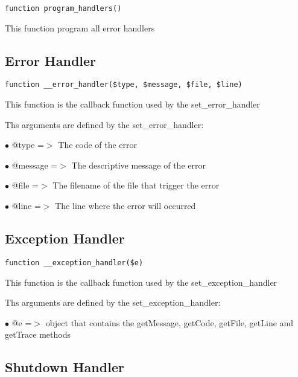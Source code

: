 \documentclass[a4paper]{book}
\begin{document}
\begin{lstlisting}
function program_handlers()
\end{lstlisting}

This function program all error handlers

\hypertarget{toc107}{}
\subsection{Error Handler}

\begin{lstlisting}
function __error_handler($type, $message, $file, $line)
\end{lstlisting}

This function is the callback function used by the set\_error\_handler

Ths arguments are defined by the set\_error\_handler:

\begin{compactitem}
\item[\color{myblue}$\bullet$] @type    =$>$ The code of the error
\item[\color{myblue}$\bullet$] @message =$>$ The descriptive message of the error
\item[\color{myblue}$\bullet$] @file    =$>$ The filename of the file that trigger the error
\item[\color{myblue}$\bullet$] @line    =$>$ The line where the error will occurred
\end{compactitem}

\hypertarget{toc108}{}
\subsection{Exception Handler}

\begin{lstlisting}
function __exception_handler($e)
\end{lstlisting}

This function is the callback function used by the set\_exception\_handler

Ths arguments are defined by the set\_exception\_handler:

\begin{compactitem}
\item[\color{myblue}$\bullet$] @e =$>$ object that contains the getMessage, getCode, getFile, getLine and getTrace
      methods
\end{compactitem}

\hypertarget{toc109}{}
\subsection{Shutdown Handler}
\end{document}
